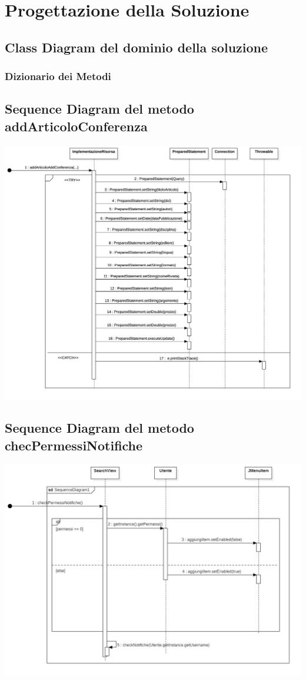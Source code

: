 \chapter{Progettazione della Soluzione}

\section{Class Diagram del dominio della soluzione}
\subsection{Dizionario dei Metodi}
\section{Sequence Diagram del metodo addArticoloConferenza}
\includegraphics[scale=0.15]{Immagini/AddArtConf_SD.png}
\section{Sequence Diagram del metodo checPermessiNotifiche}
\includegraphics[scale=0.28]{Immagini/checkPermNot_SD.jpg}
